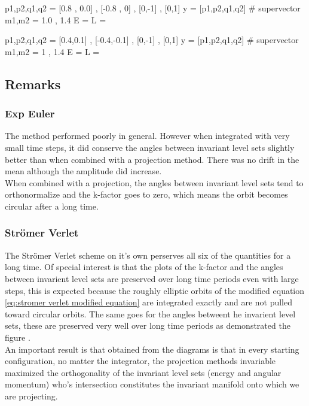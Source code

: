 \documentclass[12pt]{article}
\begin{document}

\begin{python}
p1,p2,q1,q2 = [0.8 , 0.0] , [-0.8 , 0] , [0,-1] , [0,1]
y = [p1,p2,q1,q2] # supervector
m1,m2 = 1.0 , 1.4
E = 
L = 
\end{python}


\begin{python}
p1,p2,q1,q2 = [0.4,0.1] , [-0.4,-0.1] , [0,-1] , [0,1]
y = [p1,p2,q1,q2] # supervector
m1,m2 = 1 , 1.4
E = 
L =
\end{python}


\subsection{Remarks}

\subsubsection{Exp Euler}
The method performed poorly in general. However when integrated with very small time steps, it did conserve the angles between invariant level sets slightly better than when combined with a projection method. There was no drift in the mean although the amplitude did increase. \\

When combined with a projection, the angles between invariant level sets tend to orthonormalize and the k-factor goes to zero, which means the orbit becomes circular after a long time. 

\subsubsection{Str\"omer Verlet}
The Str\"omer Verlet scheme on it's own perserves all six of the quantities for a long time. Of special interest is that the plots of the k-factor and the angles between invarient level sets are preserved over long time periods even with large steps, this is expected because the roughly elliptic orbits of the modified equation \eqref{eq:stromer verlet modified equation} are integrated exactly and are not pulled toward circular orbits. The same goes for the angles betweent he invarient level sets, these are preserved very well over long time periods as demonstrated the figure . \\

An important result is that obtained from the diagrams is that in every starting configuration, no matter the integrator, the projection methods invariable maximized the orthogonality of the invariant level sets (energy and angular momentum) who's intersection constitutes the invariant manifold onto which we are projecting.  
\end{document}
